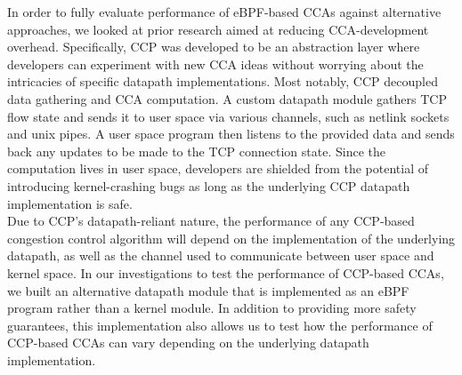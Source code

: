 \documentclass[../main.tex]{subfiles}
\begin{document}
In order to fully evaluate performance of eBPF-based CCAs against alternative approaches, we looked at prior research aimed at reducing CCA-development overhead. Specifically, CCP \cite{ccp} was developed to be an abstraction layer where developers can experiment with new CCA ideas without worrying about the intricacies of specific datapath implementations. Most notably, CCP decoupled data gathering and CCA computation. A custom datapath module gathers TCP flow state and sends it to user space via various channels, such as netlink sockets and unix pipes. A user space program then listens to the provided data and sends back any updates to be made to the TCP connection state. Since the computation lives in user space, developers are shielded from the potential of introducing kernel-crashing bugs as long as the underlying CCP datapath implementation is safe. \\ 
Due to CCP's datapath-reliant nature, the performance of any CCP-based congestion control algorithm will depend on the implementation of the underlying datapath, as well as the channel used to communicate between user space and kernel space. In our investigations to test the performance of CCP-based CCAs, we built an alternative datapath module that is implemented as an eBPF program rather than a kernel module. In addition to providing more safety guarantees, this implementation also allows us to test how the performance of CCP-based CCAs can vary depending on the underlying datapath implementation. \\
\end{document}
